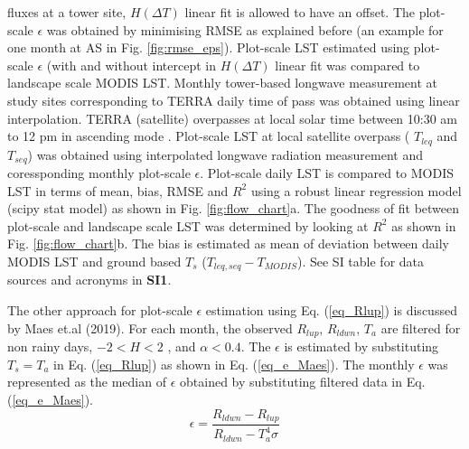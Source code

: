 \documentclass[fleqn,10pt]{wlscirep}
\begin{document}
{fluxes at a tower site, $H(\Delta T)$ linear fit is allowed to have an offset. The plot-scale $\epsilon$ was obtained by minimising RMSE as explained before (an example for one month at AS in Fig. \ref{fig:rmse_eps}). Plot-scale LST estimated using plot-scale $\epsilon$ (with and without intercept in $H(\Delta T)$ linear fit was compared to landscape scale MODIS LST. Monthly tower-based longwave measurement at study sites corresponding to TERRA daily time of pass was obtained using linear interpolation. TERRA (satellite) overpasses at local solar time between 10:30 am to 12 pm in ascending mode \cite{guillevic2017land}. Plot-scale LST at local satellite overpass ( $T_{leq}$ and $T_{seq}$) was obtained using interpolated longwave radiation measurement and coressponding monthly plot-scale $\epsilon$. Plot-scale daily LST is compared to MODIS LST in terms of mean, bias, RMSE and $R^2$ using a robust linear regression model (scipy stat model) as shown in Fig. \ref{fig:flow_chart}a. The goodness of fit between plot-scale and landscape scale LST was determined by looking at $R^2$ as shown in Fig. \ref{fig:flow_chart}b. The bias is estimated as mean of deviation between daily MODIS LST and ground based $T_{s}$ ($T_{leq,seq} - T_{MODIS}$). See SI table for data sources and acronyms in \textbf{SI1}.

The other approach for plot-scale $\epsilon$ estimation using Eq. (\ref{eq_Rlup}) is discussed by Maes et.al (2019)\cite{maes2019potential}. For each month, the observed $R_{lup}$,  $R_{ldwn}$, $T_{a}$  are filtered for non rainy days, $-2 < H <2$ , and $\alpha < 0.4$. The $\epsilon$ is estimated by substituting $T_{s} = T_{a}$ in Eq. (\ref{eq_Rlup}) as shown in Eq. (\ref{eq_e_Maes}). The monthly $\epsilon$  was represented as the median of $\epsilon$ obtained by substituting filtered data in Eq. (\ref{eq_e_Maes}). 
\begin{equation}\label{eq_e_Maes}
\epsilon = \frac{R_{ldwn} - R_{lup}}{R_{ldwn} - T_{a}^{4} \sigma}
\end{equation}

}
\end{document}
